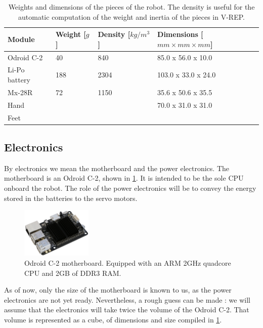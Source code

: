 \begin{table}[htp]
\center
\begin{tabularx}{\textwidth}{@{} l X X l @{}}
\toprule
\textbf{Module} & \textbf{Weight [$g$]} &  \textbf{Density [$kg/m^3$]}& \textbf{Dimensions [$mm \times mm \times mm$]}\\ 
\midrule
Odroid C-2 & 40 & 840 & 85.0 x 56.0 x 10.0\\
Li-Po battery & 188 & 2304 & 103.0 x 33.0 x 24.0\\
Mx-28R & 72 & 1150 & 35.6 x 50.6 x 35.5\\
Hand & & & 70.0 x 31.0 x 31.0\\
Feet & & & \\
\bottomrule
\end{tabularx}
\caption[Weights and dimensions of the pieces of the robot]{Weights and dimensions of the pieces of the robot. The density is useful for the automatic computation of the weight and inertia of the pieces in V-REP.}
\label{table:weights}
\end{table}

\subsection{Electronics}
By electronics we mean the motherboard and the power electronics. The motherboard is an Odroid C-2, shown in \cref{fig:electronics}. It is intended to be the sole CPU onboard the robot. The role of the power electronics will be to convey the energy stored in the batteries to the servo motors. 

\begin{figure}[htp]
\center
\includegraphics[width=0.3\textwidth]{figures/odroid-c2}
\caption[Odroid C-2 motherboard]{Odroid C-2 motherboard. Equipped with an ARM 2GHz quadcore CPU and 2GB of DDR3 RAM.}
\label{fig:electronics}
\end{figure}

As of now, only the size of the motherboard is known to us, as the power electronics are not yet ready. Nevertheless, a rough guess can be made : we will assume that the electronics will take twice the volume of the Odroid C-2. That volume is represented as a cube, of dimensions and size compiled in \cref{table:weights}.

